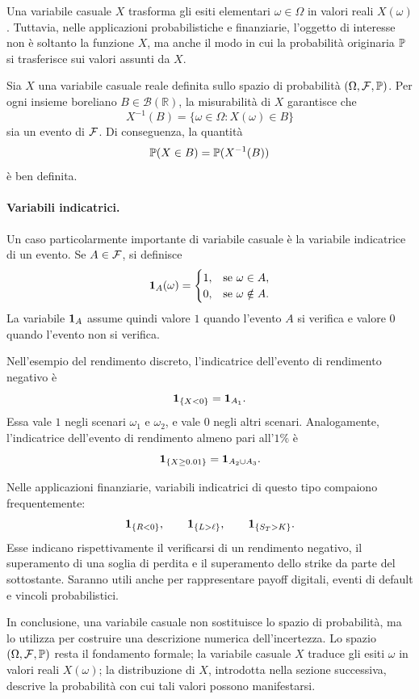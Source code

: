Una variabile casuale $X$ trasforma gli esiti elementari $\omega\in\Omega$ in
valori reali $X(\omega)$. Tuttavia, nelle applicazioni probabilistiche e
finanziarie, l'oggetto di interesse non \`{e} soltanto la funzione $X$, ma anche
il modo in cui la probabilit\`{a} originaria $\mathbb{P}$ si trasferisce sui valori
assunti da $X$.

Sia $X$ una variabile casuale reale definita sullo spazio di probabilit\`{a}
$(\Omega,\mathcal{F},\mathbb{P})$. Per ogni insieme boreliano
$B\in\mathcal{B}(\mathbb{R})$, la misurabilit\`{a} di $X$ garantisce che
\[
X^{-1}(B)=\{\omega\in\Omega:X(\omega)\in B\}
\]
sia un evento di $\mathcal{F}$. Di conseguenza, la quantit\`{a}
\[
\mathbb{P}(X\in B)
=
\mathbb{P}(X^{-1}(B))
\]
\`{e} ben definita.

\paragraph{Variabili indicatrici.}

Un caso particolarmente importante di variabile casuale \`{e} la variabile
indicatrice di un evento. Se $A\in\mathcal{F}$, si definisce
\[
\mathbf{1}_{A}(\omega)=
\begin{cases}
1, & \mbox{se }\omega\in A,\\
0, & \mbox{se }\omega\notin A.
\end{cases}
\]
La variabile $\mathbf{1}_{A}$ assume quindi valore $1$ quando l'evento $A$ si
verifica e valore $0$ quando l'evento non si verifica.

Nell'esempio del rendimento discreto, l'indicatrice dell'evento di rendimento
negativo \`{e}
\[
\mathbf{1}_{\{X<0\}}=\mathbf{1}_{A_{1}}.
\]
Essa vale $1$ negli scenari $\omega_{1}$ e $\omega_{2}$, e vale $0$ negli
altri scenari. Analogamente, l'indicatrice dell'evento di rendimento almeno
pari all'$1\%$ \`{e}
\[
\mathbf{1}_{\{X\geq0.01\}}=\mathbf{1}_{A_{2}\cup A_{3}}.
\]


Nelle applicazioni finanziarie, variabili indicatrici di questo tipo compaiono
frequentemente:
\[
\1_{\{R<0\}}, \qquad\1_{\{L>\ell\}}, \qquad\1%
_{\{S_{T}>K\}}.
\]
Esse indicano rispettivamente il verificarsi di un rendimento negativo, il
superamento di una soglia di perdita e il superamento dello strike da parte
del sottostante. Saranno utili anche per rappresentare payoff digitali, eventi
di default e vincoli probabilistici.

In conclusione, una variabile casuale non sostituisce lo spazio di
probabilit\`{a}, ma lo utilizza per costruire una descrizione numerica
dell'incertezza. Lo spazio $(\Omega,\mathcal{F},\mathbb{P})$ resta il
fondamento formale; la variabile casuale $X$ traduce gli esiti $\omega$ in
valori reali $X(\omega)$; la distribuzione di $X$, introdotta nella sezione
successiva, descrive la probabilit\`{a} con cui tali valori possono manifestarsi.

